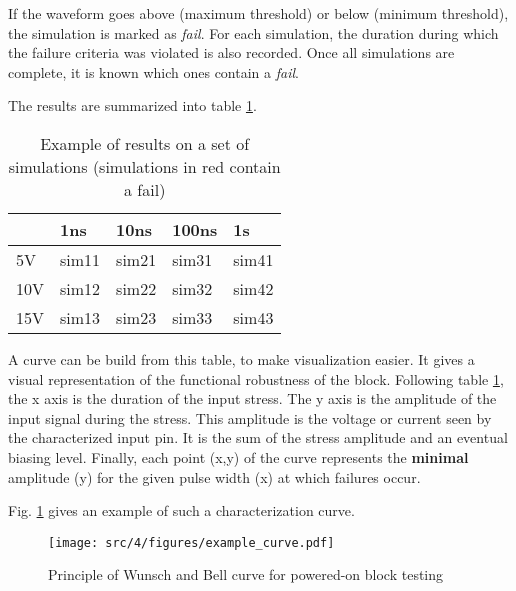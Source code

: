 If the waveform goes above (maximum threshold) or below (minimum threshold), the simulation is marked as \textit{fail}.
For each simulation, the duration during which the failure criteria was violated is also recorded.
Once all simulations are complete, it is known which ones contain a \textit{fail}.

The results are summarized into table \ref{simulation-results}.

\begin{table}[!h]
\centering
\begin{tabular}{@{}lllll@{}}
\toprule
    & 1ns                          & 10ns                         & 100ns                        & 1\textmugreek{}s             \\ \midrule
5V  & {\color[HTML]{32CB00} sim11} & {\color[HTML]{32CB00} sim21} & {\color[HTML]{32CB00} sim31} & {\color[HTML]{FE0000} sim41} \\
10V & {\color[HTML]{32CB00} sim12} & {\color[HTML]{FE0000} sim22} & {\color[HTML]{FE0000} sim32} & {\color[HTML]{FE0000} sim42} \\
15V & {\color[HTML]{FE0000} sim13} & {\color[HTML]{FE0000} sim23} & {\color[HTML]{FE0000} sim33} & {\color[HTML]{FE0000} sim43} \\ \bottomrule
\end{tabular}
\caption{Example of results on a set of simulations (simulations in red contain a fail)}
\label{simulation-results}
\end{table}

A curve can be build from this table, to make visualization easier.
It gives a visual representation of the functional robustness of the block.
Following table \ref{simulation-results}, the x axis is the duration of the input stress.
The y axis is the amplitude of the input signal during the stress.
This amplitude is the voltage or current seen by the characterized input pin.
It is the sum of the stress amplitude and an eventual biasing level.
Finally, each point (x,y) of the curve represents the \textbf{minimal} amplitude (y) for the given pulse width (x) at which failures occur.

Fig. \ref{wb_cz_curve_example} gives an example of such a characterization curve.

\begin{figure}[!h]
  \centering
  \texttt{[image: src/4/figures/example\_curve.pdf]}
  \caption{Principle of Wunsch and Bell curve for powered-on block testing}
  \label{wb_cz_curve_example}
\end{figure}

